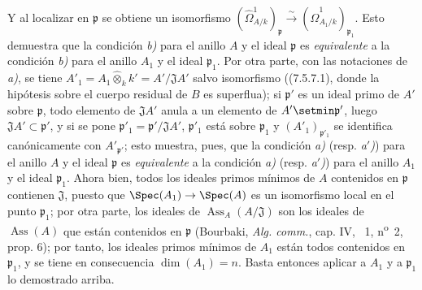 Y al localizar en $\mathfrak p$ se obtiene un isomorfismo
$(\hat{\Omega}^1_{A/k})_{\mathfrak p}\xrightarrow{\sim}(\hat{\Omega}^1_{A_1/k})_{\mathfrak p_1}$.
Esto demuestra que la condición \emph{b)} para el anillo $A$ y el ideal $\mathfrak p$ es \emph{equivalente} a la condición \emph{b)} para el anillo $A_1$ y el ideal $\mathfrak p_1$. Por otra parte, con las notaciones de \emph{a)}, se tiene $A'_1=A_1\widehat{\otimes}_k k'=A'/\mathfrak JA'$ salvo isomorfismo ((7.5.7.1), donde la hipótesis sobre el cuerpo residual de $B$ es superflua); si $\mathfrak p'$ es un ideal primo de $A'$ sobre $\mathfrak p$, todo elemento de $\mathfrak JA'$ anula a un elemento de $A'\setmin\mathfrak p'$, luego $\mathfrak JA'\subset\mathfrak p'$, y si se pone $\mathfrak p'_1=\mathfrak p'/\mathfrak JA'$, $\mathfrak p'_1$ está sobre $\mathfrak p_1$ y $(A'_1)_{\mathfrak p'_1}$ se identifica canónicamente con $A'_{\mathfrak p'}$; esto muestra, pues, que la condición \emph{a)} (resp. \emph{a$'$)}) para el anillo $A$ y el ideal $\mathfrak p$ es \emph{equivalente} a la condición \emph{a)} (resp. \emph{a$'$)}) para el anillo $A_1$ y el ideal $\mathfrak p_1$. Ahora bien, todos los ideales primos mínimos de $A$ contenidos en $\mathfrak p$ contienen $\mathfrak J$, puesto que $\Spec(A_1)\to\Spec(A)$ es un isomorfismo local en el punto $\mathfrak p_1$; por otra parte, los ideales de $\operatorname{Ass}_A(A/\mathfrak J)$ son los ideales de $\operatorname{Ass}(A)$ que están contenidos en $\mathfrak p$ (Bourbaki, \emph{Alg. comm.}, cap. IV, \textsection~1, n\textsuperscript{o}~2, prop. 6); por tanto, los ideales primos mínimos de $A_1$ están todos contenidos en $\mathfrak p_1$, y se tiene en consecuencia $\dim(A_1)=n$. Basta entonces aplicar a $A_1$ y a $\mathfrak p_1$ lo demostrado arriba.

